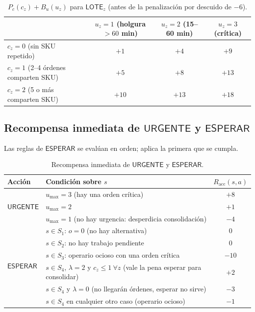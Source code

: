 \documentclass[11pt,letterpaper]{article}
\newcommand{\LOTE}[1]{\mathsf{LOTE}_{#1}}
\newcommand{\URG}{\mathsf{URGENTE}}
\newcommand{\ESP}{\mathsf{ESPERAR}}
\newcommand{\umax}{u_{\max}}
\begin{document}
\begin{table}[h]
\centering\small
\begin{tabular}{@{}lccc@{}}
\toprule
 & \textbf{$u_z=1$} (holgura $>60$ min) & \textbf{$u_z=2$} (15--60 min) & \textbf{$u_z=3$} (crítica) \\
\midrule
$c_z=0$ (sin SKU repetido)          & $+1$  & $+4$  & $+9$  \\
$c_z=1$ (2--4 órdenes comparten SKU) & $+5$  & $+8$  & $+13$ \\
$c_z=2$ (5 o más comparten SKU)      & $+10$ & $+13$ & $+18$ \\
\bottomrule
\end{tabular}
\caption{$P_c(c_z)+B_u(u_z)$ para $\LOTE{z}$ (antes de la penalización por descuido de $-6$).}
\end{table}

\subsection{Recompensa inmediata de \texorpdfstring{$\URG$ y $\ESP$}{URGENTE y ESPERAR}}

Las reglas de $\ESP$ se evalúan en orden; aplica la primera que se cumpla.

\begin{table}[h]
\centering\small
\begin{tabularx}{\textwidth}{@{}p{2cm}Lc@{}}
\toprule
\textbf{Acción} & \textbf{Condición sobre $s$} & \textbf{$R_{\mathrm{acc}}(s,a)$} \\
\midrule
\multirow{3}{*}{$\URG$} & $\umax = 3$ (hay una orden crítica) & $+8$ \\
 & $\umax = 2$ & $+1$ \\
 & $\umax = 1$ (no hay urgencia: desperdicia consolidación) & $-4$ \\
\midrule
\multirow{6}{*}{$\ESP$} & $s\in S_1$: $o = 0$ (no hay alternativa) & $0$ \\
 & $s\in S_2$: no hay trabajo pendiente & $0$ \\
 & $s\in S_3$: operario ocioso con una orden crítica & $-10$ \\
 & $s\in S_4$, $\lambda = 2$ y $c_z \le 1\ \forall z$ (vale la pena esperar para consolidar) & $+2$ \\
 & $s\in S_4$ y $\lambda = 0$ (no llegarán órdenes, esperar no sirve) & $-3$ \\
 & $s\in S_4$ en cualquier otro caso (operario ocioso) & $-1$ \\
\bottomrule
\end{tabularx}
\caption{Recompensa inmediata de $\URG$ y $\ESP$.}
\end{table}
\end{document}
